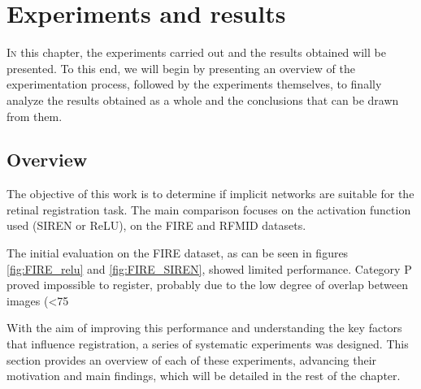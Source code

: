 \chapter{Experiments and results}
\label{chap:Experimentos e resultados}
\lettrine{I}{n} this chapter, the experiments carried out and the results obtained will be presented.
To this end, we will begin by presenting an overview of the experimentation process,
followed by the experiments themselves, to finally analyze the results obtained as a whole and the conclusions that can be drawn from them.

\section{Overview}
\label{sec:Vista Xeral}

The objective of this work is to determine if implicit networks are suitable for the retinal registration task. The main comparison focuses on the activation function used (SIREN or ReLU), on the FIRE and RFMID datasets.

The initial evaluation on the FIRE dataset, as can be seen in figures \ref{fig:FIRE_relu} and \ref{fig:FIRE_SIREN}, showed limited performance. Category P proved impossible to register, probably due to the low degree of overlap between images (<75%

With the aim of improving this performance and understanding the key factors that influence registration, a series of systematic experiments was designed. This section provides an overview of each of these experiments, advancing their motivation and main findings, which will be detailed in the rest of the chapter.

